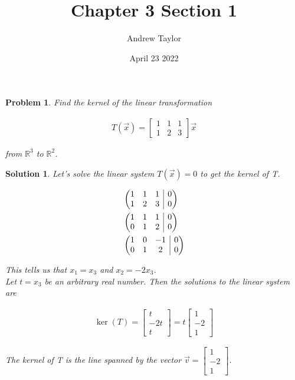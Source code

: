 \documentclass{article}
\title{Chapter 3 Section 1}
\author{Andrew Taylor}
\date{April 23 2022}
\newtheorem{problem}{Problem}
\newtheorem*{solution}{Solution}
\begin{document}
\maketitle

\begin{problem}
Find the kernel of the linear transformation 

\begin{align*}
T(\vec{x}) = \begin{bmatrix}1 & 1 & 1 \\ 1 & 2 & 3 \end{bmatrix} \vec{x}
\end{align*}

from $\mathbb{R}^3$ to $\mathbb{R}^2$.

\end{problem}

\begin{solution}
Let's solve the linear system $T(\vec{x}) = 0$ to get the kernel of T.

\begin{align*}
& \left( \begin{array}{@{}ccc|c@{}}
1 & 1 & 1 & 0 \\
1 & 2 & 3 & 0
\end{array} \right) \\
& \left( \begin{array}{@{}ccc|c@{}}
1 & 1 & 1 & 0 \\
0 & 1 & 2 & 0
\end{array} \right) \\
& \left( \begin{array}{@{}ccc|c@{}}
1 & 0 & -1 & 0 \\
0 & 1 & 2 & 0
\end{array} \right) \\
\end{align*}

This tells us that $x_{1} = x_{3}$ and $x_{2} = -2x_{3}$. \\

Let $t = x_{3}$ be an arbitrary real number. Then the solutions to the linear system are

\begin{align*}
\ker(T) = \begin{bmatrix} t \\ -2t \\ t \end{bmatrix} = t \begin{bmatrix} 1 \\ -2 \\ 1 \end{bmatrix}
\end{align*}

The kernel of T is the line spanned by the vector $\vec{v} = \begin{bmatrix}1 \\ -2 \\ 1\end{bmatrix}$.

\end{solution}
\end{document}
